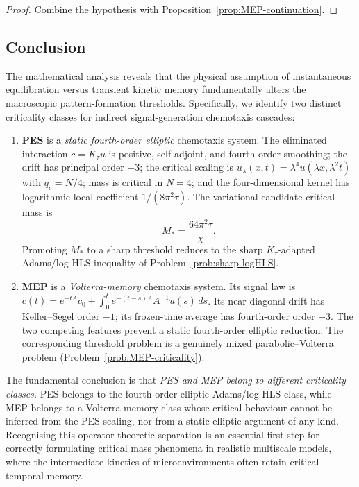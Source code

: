 \documentclass[11pt,reqno]{amsart}
\theoremstyle{definition}
\theoremstyle{remark}
\begin{document}
\begin{proof}
Combine the hypothesis with Proposition~\ref{prop:MEP-continuation}.
\end{proof}



\subsection{Conclusion}
\label{subsec:conclusion}

The mathematical analysis reveals that the physical assumption of instantaneous equilibration versus transient kinetic memory fundamentally alters the macroscopic pattern-formation thresholds. Specifically, we identify two distinct criticality classes for indirect signal-generation chemotaxis cascades:

\begin{enumerate}[label=(\roman*),leftmargin=2em]
\item \textbf{PES} is a \emph{static fourth-order elliptic} chemotaxis system. The eliminated interaction $c=K_\tau u$ is positive, self-adjoint, and fourth-order smoothing; the drift has principal order $-3$; the critical scaling is $u_\lambda(x,t)=\lambda^{4}u(\lambda x,\lambda^{2}t)$ with $q_c=N/4$; mass is critical in $N=4$; and the four-dimensional kernel has logarithmic local coefficient $1/(8\pi^{2}\tau)$. The variational candidate critical mass is
\[
        M_{\!*}=\frac{64\pi^{2}\tau}{\chi}.
\]
Promoting $M_{\!*}$ to a sharp threshold reduces to the sharp $K_\tau$-adapted Adams/log-HLS inequality of Problem~\ref{prob:sharp-logHLS}.

\item \textbf{MEP} is a \emph{Volterra-memory} chemotaxis system. Its signal law is $c(t)=e^{-tA}c_0+\int_0^t e^{-(t-s)A}A^{-1}u(s)\,ds$. Its near-diagonal drift has Keller--Segel order $-1$; its frozen-time average has fourth-order order $-3$. The two competing features prevent a static fourth-order elliptic reduction. The corresponding threshold problem is a genuinely mixed parabolic--Volterra problem (Problem~\ref{prob:MEP-criticality}).
\end{enumerate}

The fundamental conclusion is that \textit{PES and MEP belong to different criticality classes.} PES belongs to the fourth-order elliptic Adams/log-HLS class, while MEP belongs to a Volterra-memory class whose critical behaviour cannot be inferred from the PES scaling, nor from a static elliptic argument of any kind. Recognising this operator-theoretic separation is an essential first step for correctly formulating critical mass phenomena in realistic multiscale models, where the intermediate kinetics of microenvironments often retain critical temporal memory.
\end{document}
